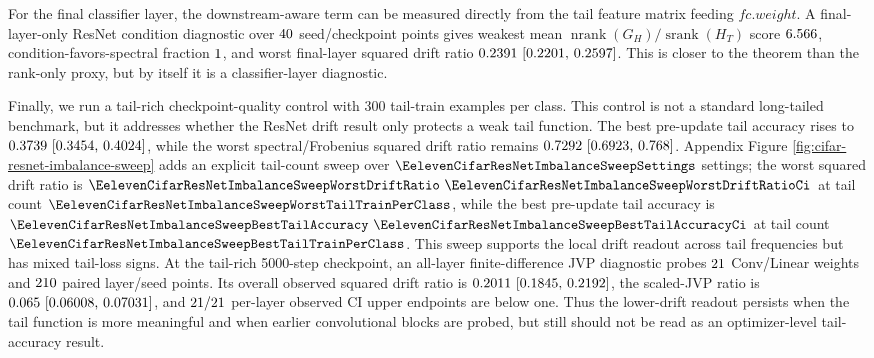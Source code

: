 \documentclass{article}
\theoremstyle{definition}
\newcommand{\srank}{\operatorname{srank}}
\newcommand{\nrank}{\operatorname{nrank}}
\begin{document}
For the final classifier layer, the downstream-aware term can be measured directly from the tail feature matrix feeding \(fc.weight\). A final-layer-only ResNet condition diagnostic over \(40\) seed/checkpoint points gives weakest mean \(\nrank(G_H)/\srank(H_T)\) score \(6.566\), condition-favors-spectral fraction \(1\), and worst final-layer squared drift ratio \(0.2391 ~\text{[0.2201,\hspace{0.35em}0.2597]}\). This is closer to the theorem than the rank-only proxy, but by itself it is a classifier-layer diagnostic.

Finally, we run a tail-rich checkpoint-quality control with 300 tail-train examples per class. This control is not a standard long-tailed benchmark, but it addresses whether the ResNet drift result only protects a weak tail function. The best pre-update tail accuracy rises to \(0.3739 ~\text{[0.3454,\hspace{0.35em}0.4024]}\), while the worst spectral/Frobenius squared drift ratio remains \(0.7292 ~\text{[0.6923,\hspace{0.35em}0.768]}\). Appendix Figure \ref{fig:cifar-resnet-imbalance-sweep} adds an explicit tail-count sweep over \(\EelevenCifarResNetImbalanceSweepSettings\) settings; the worst squared drift ratio is \(\EelevenCifarResNetImbalanceSweepWorstDriftRatio ~\EelevenCifarResNetImbalanceSweepWorstDriftRatioCi\) at tail count \(\EelevenCifarResNetImbalanceSweepWorstTailTrainPerClass\), while the best pre-update tail accuracy is \(\EelevenCifarResNetImbalanceSweepBestTailAccuracy ~\EelevenCifarResNetImbalanceSweepBestTailAccuracyCi\) at tail count \(\EelevenCifarResNetImbalanceSweepBestTailTrainPerClass\). This sweep supports the local drift readout across tail frequencies but has mixed tail-loss signs. At the tail-rich 5000-step checkpoint, an all-layer finite-difference JVP diagnostic probes \(21\) Conv/Linear weights and \(210\) paired layer/seed points. Its overall observed squared drift ratio is \(0.2011 ~\text{[0.1845,\hspace{0.35em}0.2192]}\), the scaled-JVP ratio is \(0.065 ~\text{[0.06008,\hspace{0.35em}0.07031]}\), and \(21/21\) per-layer observed CI upper endpoints are below one. Thus the lower-drift readout persists when the tail function is more meaningful and when earlier convolutional blocks are probed, but still should not be read as an optimizer-level tail-accuracy result.
\end{document}
